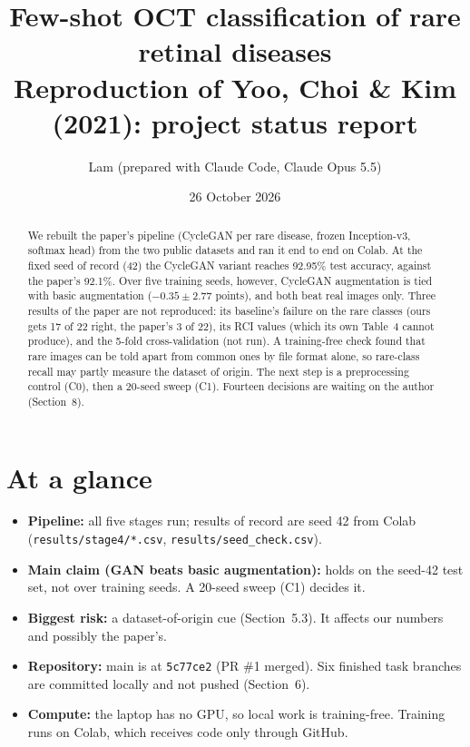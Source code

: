 \documentclass[10pt,a4paper]{article}
\title{\textbf{Few-shot OCT classification of rare retinal diseases}\\[2pt]
  \large Reproduction of Yoo, Choi \& Kim (2021): project status report}
\author{Lam \quad (prepared with Claude Code, Claude Opus 5.5)}
\date{26 October 2026}
\newcommand{\file}[1]{\texttt{\small #1}}
\begin{document}
\maketitle

\begin{abstract}
\noindent
We rebuilt the paper's pipeline (CycleGAN per rare disease, frozen Inception-v3, softmax
head) from the two public datasets and ran it end to end on Colab. At the fixed seed of
record (42) the CycleGAN variant reaches 92.95\% test accuracy, against the paper's 92.1\%.
Over five training seeds, however, CycleGAN augmentation is tied with basic augmentation
($-0.35 \pm 2.77$ points), and both beat real images only. Three results of the paper are
not reproduced: its baseline's failure on the rare classes (ours gets 17 of 22 right, the
paper's 3 of 22), its RCI values (which its own Table~4 cannot produce), and the 5-fold
cross-validation (not run). A training-free check found that rare images can be told apart
from common ones by file format alone, so rare-class recall may partly measure the dataset
of origin. The next step is a preprocessing control (C0), then a 20-seed sweep (C1).
Fourteen decisions are waiting on the author (Section~8).
\end{abstract}

\tableofcontents

\section{At a glance}

\begin{itemize}
  \item \textbf{Pipeline:} all five stages run; results of record are seed 42 from Colab
        (\file{results/stage4/*.csv}, \file{results/seed\_check.csv}).
  \item \textbf{Main claim (GAN beats basic augmentation):} holds on the seed-42 test set,
        not over training seeds. A 20-seed sweep (C1) decides it.
  \item \textbf{Biggest risk:} a dataset-of-origin cue (Section~5.3). It affects our numbers
        and possibly the paper's.
  \item \textbf{Repository:} main is at \file{5c77ce2} (PR \#1 merged). Six finished task
        branches are committed locally and not pushed (Section~6).
  \item \textbf{Compute:} the laptop has no GPU, so local work is training-free. Training
        runs on Colab, which receives code only through GitHub.
\end{itemize}
\end{document}
